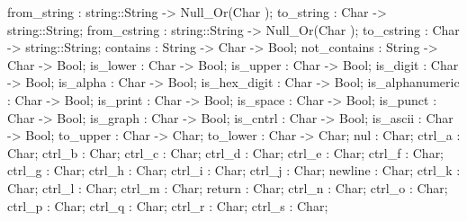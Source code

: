 {{{{                                        from_string : string::String -> Null_Or(Char );
                                        to_string : Char -> string::String;
                                        from_cstring : string::String -> Null_Or(Char );
                                        to_cstring : Char -> string::String;
                                        contains : String -> Char -> Bool;
                                        not_contains : String -> Char -> Bool;
                                        is_lower : Char -> Bool;
                                        is_upper : Char -> Bool;
                                        is_digit : Char -> Bool;
                                        is_alpha : Char -> Bool;
                                        is_hex_digit : Char -> Bool;
                                        is_alphanumeric : Char -> Bool;
                                        is_print : Char -> Bool;
                                        is_space : Char -> Bool;
                                        is_punct : Char -> Bool;
                                        is_graph : Char -> Bool;
                                        is_cntrl : Char -> Bool;
                                        is_ascii : Char -> Bool;
                                        to_upper : Char -> Char;
                                        to_lower : Char -> Char;
                                        nul : Char;
                                        ctrl_a : Char;
                                        ctrl_b : Char;
                                        ctrl_c : Char;
                                        ctrl_d : Char;
                                        ctrl_e : Char;
                                        ctrl_f : Char;
                                        ctrl_g : Char;
                                        ctrl_h : Char;
                                        ctrl_i : Char;
                                        ctrl_j : Char;
                                        newline : Char;
                                        ctrl_k : Char;
                                        ctrl_l : Char;
                                        ctrl_m : Char;
                                        return : Char;
                                        ctrl_n : Char;
                                        ctrl_o : Char;
                                        ctrl_p : Char;
                                        ctrl_q : Char;
                                        ctrl_r : Char;
                                        ctrl_s : Char;
}}}}
